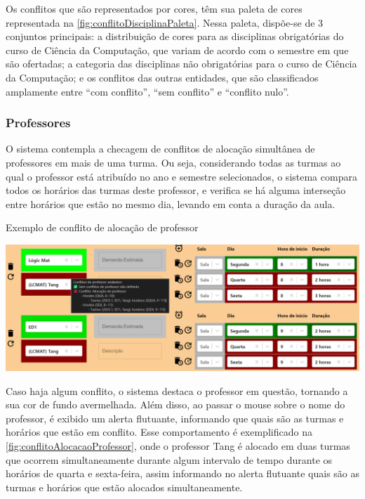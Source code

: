 Os conflitos que são representados por cores, têm sua paleta de cores representada na \autoref{fig:conflitoDisciplinaPaleta}. Nessa paleta, dispõe-se de 3 conjuntos principais: a distribuição de cores para as disciplinas obrigatórias do curso de Ciência da Computação, que variam de acordo com o semestre em que são ofertadas; a categoria das disciplinas não obrigatórias para o curso de Ciência da Computação; e os conflitos das outras entidades, que são classificados amplamente entre ``com conflito'', ``sem conflito'' e ``conflito nulo''.

\subsubsection{Professores} \label{sssec:Professores}

O sistema contempla a checagem de conflitos de alocação simultânea de professores em mais de uma turma. Ou seja, considerando todas as turmas ao qual o professor está atribuído no ano e semestre selecionados, o sistema compara todos os horários das turmas deste professor, e verifica se há alguma interseção entre horários que estão no mesmo dia, levando em conta a duração da aula.

\begin{MyCenteredFigure}
  \caption{Exemplo de conflito de alocação de professor}
  \label{fig:conflitoAlocacaoProfessor}
  \includegraphics[width=\textwidth]{files/img/2.02!5-desenvolvimento/2.02!5.1.5-conflitos/Alocação de professores}
\end{MyCenteredFigure}

Caso haja algum conflito, o sistema destaca o professor em questão, tornando a sua cor de fundo avermelhada. Além disso, ao passar o mouse sobre o nome do professor, é exibido um alerta flutuante, informando que quais são as turmas e horários que estão em conflito. Esse comportamento é exemplificado na \autoref{fig:conflitoAlocacaoProfessor}, onde o professor Tang é alocado em duas turmas que ocorrem simultaneamente durante algum intervalo de tempo durante os horários de quarta e sexta-feira, assim informando no alerta flutuante quais são as turmas e horários que estão alocados simultaneamente.

